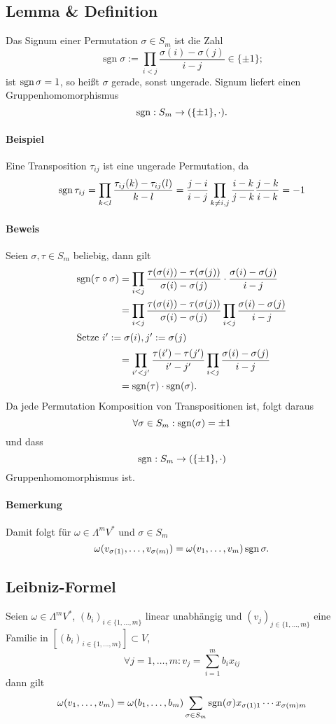 \subsection{Lemma \& Definition}
	\begin{Definition}
	Das Signum einer Permutation $ \sigma\in S_m $ ist die Zahl
		\[ \operatorname{sgn}\sigma := \prod_{i<j} \frac{\sigma(i)-\sigma(j)}{i-j}\in \{\pm 1\}; \]
	ist $ \operatorname{sgn}\sigma = 1 $, so heißt $ \sigma $ gerade, sonst ungerade. Signum liefert einen Gruppenhomomorphismus
		\[ \operatorname{sgn}: S_m\to (\{\pm 1\},\cdot). \]
	\end{Definition}
\paragraph{Beispiel}
	Eine Transposition $ \tau_{ij} $ ist eine ungerade Permutation, da
		\[ \operatorname{sgn}\tau_{ij} = \prod_{k<l}\frac{\tau_{ij}(k)-\tau_{ij}(l)}{k-l} = \frac{j-i}{i-j}\prod_{k\neq i,j}\frac{i-k}{j-k}\frac{j-k}{i-k} = -1 \]
\paragraph{Beweis}
	Seien $ \sigma,\tau\in S_m $ beliebig, dann gilt
	\begin{align*} \operatorname{sgn}(\tau\circ\sigma) &= \prod_{i<j}\frac{\tau(\sigma(i))-\tau(\sigma(j))}{\sigma(i)-\sigma(j)}\cdot\frac{\sigma(i)-\sigma(j)}{i-j} \\
	&= \prod_{i<j}\frac{\tau(\sigma(i))-\tau(\sigma(j))}{\sigma(i)-\sigma(j)}\prod_{i<j}\frac{\sigma(i)-\sigma(j)}{i-j}\\
	\intertext{Setze $i':=\sigma(i), j':=\sigma(j) $}
	&=\prod_{i'<j'}\frac{\tau(i')-\tau(j')}{i'-j'}\prod_{i<j}\frac{\sigma(i)-\sigma(j)}{i-j}\\
	&= \operatorname{sgn}(\tau)\cdot \operatorname{sgn}(\sigma).
	\end{align*}
	Da jede Permutation Komposition von Transpositionen ist, folgt daraus
		\[ \forall \sigma \in S_m:\operatorname{sgn}(\sigma) = \pm 1 \]
	und dass
		\[ \operatorname{sgn}:S_m \to (\{\pm 1\},\cdot) \]
	Gruppenhomomorphismus ist.
\paragraph{Bemerkung}
	Damit folgt für $ \omega\in \Lambda^mV^* $ und $ \sigma \in S_m $
		\[ \omega(v_{\sigma(1)},\dots,v_{\sigma(m)}) =\omega(v_1,\dots,v_m)\operatorname{sgn}\sigma. \]
\subsection{Leibniz-Formel}
	\begin{Satz}
		Seien $ \omega\in \Lambda^mV^* $, $ (b_i)_{i\in \{1,\dots,m\}} $ linear unabhängig und $ (v_j)_{j\in \{1,\dots,m\}} $ eine Familie in $ [(b_i)_{i\in\{1,\dots,m\}}] \subset V$,
		\[ \forall j=1,\dots,m: v_j = \sum_{i=1}^{m}b_ix_{ij} \]
	dann gilt
		\[ \omega(v_1,\dots,v_m)=\omega(b_1,\dots,b_m)\sum_{\sigma\in S_m}\operatorname{sgn}(\sigma)x_{\sigma(1)1} \cdots x_{\sigma(m)m} \]
	\end{Satz}
